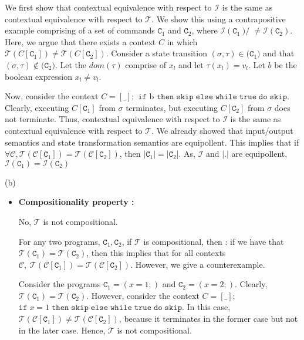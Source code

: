 \documentclass{article}
\newcommand{\C}{\mathtt{C}}
\newcommand{\true}{\mathtt{true}}
\newcommand{\ifsym}{\mathtt{if}}
\newcommand{\then}{\mathtt{then}}
\newcommand{\elsesym}{\mathtt{else}}
\newcommand{\whilesym}{\mathtt{while}}
\newcommand{\dosym}{\mathtt{do}}
\newcommand{\skipsym}{\mathtt{skip}}
\begin{document}
\begin{enumerate}
\begin{itemize}
 	We first show that contextual equivalence with respect to $\mathcal{I}$ is 
 	the same as contextual equivalence with respect to $\mathcal{T}$.
	We show this using a contrapositive example comprising of a set of commands
	$\C_1$ and $\C_2$, where $\mathcal{I}(\C_1) ̸\neq \mathcal{I}(\C_2)$.
	Here, we argue that there exists a context $C$ in which 
	$\mathcal{T}(C [\C_1 ]) \neq \mathcal{T}(C [\C_2 ])$.
	Consider a state transition $(\sigma,\tau) \in \mathcal(\C_1)$ and
	that $(\sigma,\tau) \notin \mathcal(\C_2)$.
	Let the $dom(\tau)$ comprise of $x_{l}$ and let $\tau(x_{l}) = v_{l}$. 
	Let $b$ be the boolean expression $x_{l} \neq v_{l}$.

	Now, consider the context $C = [ \_ ];$ $\ifsym$ b $ \then \; \skipsym \;
	\elsesym \; \whilesym \; \true \; \dosym \; \skipsym$. Clearly, executing
	$C[\C_1]$ from $\sigma$ terminates, but executing $C[\C_2]$ from $\sigma$ does not terminate. Thus, 
	contextual equivalence with respect to $\mathcal{I}$ is the same as 
	contextual equivalence with respect to $\mathcal{T}$.
    We already showed that input/output semantics and state transformation
    semantics are equipollent.
    This implies that if $\forall \mathcal{C},
    \mathcal{T}(\mathcal{C}[\C_1]) = \mathcal{T}(\mathcal{C}[\C_2])$, 
    then $| \C_1 | = | \C_2 |$. As, $\mathcal{I}$ and $|.|$ are equipollent,
	$\mathcal{I}(\C_1) = \mathcal{I}(\C_2)$
	
\end{itemize}

(b) \begin{itemize}

\item \textbf{Compositionality property :}

	No, $\mathcal{T}$ is not compositional.

	For any two programs, $\C_1,\C_2$, if $\mathcal{T}$ is compositional,
	then : if we have that $\mathcal{T}(\C_1) = \mathcal{T}(\C_2)$, then 
	this implies that for all contexts $\mathcal{C}, \;
	\mathcal{T}(\mathcal{C}[\C_1]) = \mathcal{T}(\mathcal{C}[\C_2])$.
	However, we give a counterexample.
		
	Consider the programs $\C_1 = (x = 1;)$ and $\C_2 = (x = 2;)$.
	Clearly, $\mathcal{T}(\C_1) = \mathcal{T}(\C_2)$.
	However, consider the context $C = [ \_ ];$ $\ifsym \; x = 1 \; \then \;
	\skipsym \; \elsesym \; \whilesym \; \true \; \dosym \; \skipsym$.
	In this case,  $\mathcal{T}(\mathcal{C}[\C_1]) \neq \mathcal{T}(\mathcal{C}
	[\C_2])$, because it terminates in the former case but not in the later
	case. Hence, $\mathcal{T}$ is not compositional. 


\end{itemize}
\end{enumerate}
\end{document}
